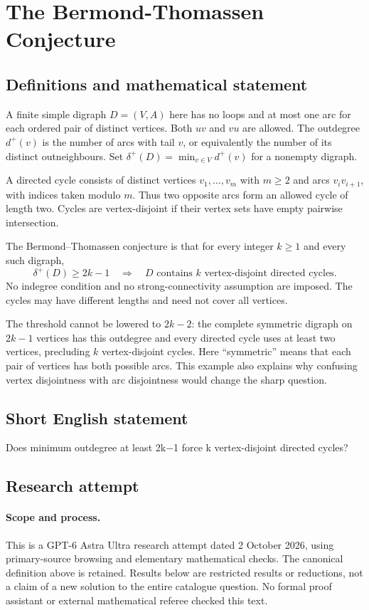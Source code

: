 \documentclass[11pt,a4paper]{article}
\begin{document}
\section*{The Bermond-Thomassen Conjecture}\label{statement}

\subsection{Definitions and mathematical statement}
A finite simple digraph $D=(V,A)$ here has no loops and at most one arc
for each ordered pair of distinct vertices. Both $uv$ and $vu$ are
allowed. The outdegree $d^+(v)$ is the number of arcs with tail $v$, or
equivalently the number of its distinct outneighbours. Set
$\delta^+(D)=\min_{v\in V}d^+(v)$ for a nonempty digraph.

A directed cycle consists of distinct vertices $v_1,\ldots,v_m$ with
$m\ge2$ and arcs $v_iv_{i+1}$, with indices taken modulo $m$. Thus two
opposite arcs form an allowed cycle of length two. Cycles are
vertex-disjoint if their vertex sets have empty pairwise intersection.

The Bermond--Thomassen conjecture is that for every integer $k\ge1$ and
every such digraph,
\[
         \delta^+(D)\ge2k-1
        \quad\Longrightarrow\quad
        D\text{ contains }k\text{ vertex-disjoint directed cycles}.
\]
No indegree condition and no strong-connectivity assumption are imposed.
The cycles may have different lengths and need not cover all vertices.

The threshold cannot be lowered to $2k-2$: the complete symmetric
digraph on $2k-1$ vertices has this outdegree and every directed cycle
uses at least two vertices, precluding $k$ vertex-disjoint cycles.
Here ``symmetric'' means that each pair of vertices has both possible
arcs. This example also explains why confusing vertex disjointness with
arc disjointness would change the sharp question.
\subsection{Short English statement}
Does minimum outdegree at least 2k−1 force k vertex-disjoint directed cycles?
\subsection{Research attempt}
\paragraph{Scope and process.}
This is a GPT-6 Astra Ultra research attempt dated 2 October 2026, using
primary-source browsing and elementary mathematical checks. The canonical
definition above is retained. Results below are restricted results or
reductions, not a claim of a new solution to the entire catalogue question.
No formal proof assistant or external mathematical referee checked this text.
\end{document}
